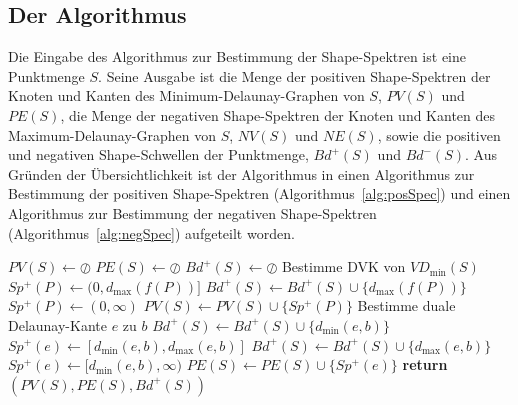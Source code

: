 \subsection*{Der Algorithmus}

Die Eingabe des Algorithmus zur Bestimmung der Shape-Spektren ist eine Punktmenge $S$. Seine Ausgabe ist die Menge der positiven Shape-Spektren der Knoten und Kanten des Minimum-Delaunay-Graphen von $S$, $PV(S)$ und $PE(S)$, die Menge der negativen Shape-Spektren der Knoten und Kanten des Maximum-Delaunay-Graphen von $S$, $NV(S)$ und $NE(S)$, sowie die positiven und negativen Shape-Schwellen der Punktmenge, $Bd^+(S)$ und $Bd^-(S)$. Aus Gründen der Übersichtlichkeit ist der Algorithmus in einen Algorithmus zur Bestimmung der positiven Shape-Spektren (Algorithmus~\ref{alg:posSpec}) und einen Algorithmus zur Bestimmung der negativen Shape-Spektren (Algorithmus~\ref{alg:negSpec}) aufgeteilt worden.

\begin{algorithm}\caption{Bestimmung der positiven Shape-Spektren}\label{alg:posSpec}
\begin{algorithmic}[0]
	\State $PV(S) \gets \oslash$
	\State $PE(S) \gets \oslash$
	\State $Bd^+(S) \gets \oslash$
	\State Bestimme DVK von $VD_{\min}(S)$
			\State $Sp^+(P) \gets (0, d_{\max}(f(P))]$
			\State $Bd^+(S) \gets Bd^+(S) \cup \lbrace d_{\max}(f(P)) \rbrace$
		\Else
			\State $Sp^+(P) \gets (0, \infty)$
		\EndIf
		\State $PV(S) \gets PV(S) \cup \lbrace Sp^+(P) \rbrace$
	\EndFor
		\State Bestimme duale Delaunay-Kante $e$ zu $b$
		\State $Bd^+(S) \gets Bd^+(S) \cup \lbrace d_{\min}(e,b) \rbrace$
			\State $Sp^+(e) \gets [d_{\min}(e,b),d_{\max}(e,b)]$
			\State $Bd^+(S) \gets Bd^+(S) \cup \lbrace d_{\max}(e,b) \rbrace$
		\Else
			\State $Sp^+(e) \gets [d_{\min}(e,b),\infty)$
		\EndIf
		\State $PE(S) \gets PE(S) \cup \lbrace Sp^+(e) \rbrace$
	\EndFor
	\State \textbf{return} $(PV(S),PE(S),Bd^+(S))$
\EndFunction
\end{algorithmic}
\end{algorithm}

